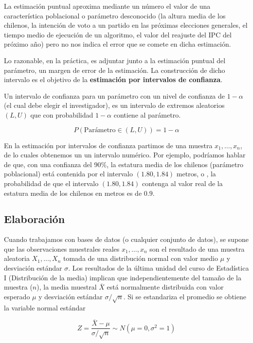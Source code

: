 \documentclass[
  11pt,
]{book}
\theoremstyle{definition}
\theoremstyle{definition}
\theoremstyle{definition}
\theoremstyle{definition}
\theoremstyle{remark}
\begin{document}
La estimación puntual aproxima mediante un número el valor de una característica poblacional o parámetro desconocido (la altura media de los chilenos, la intención de voto a un partido en las próximas elecciones generales, el tiempo medio de ejecución de un algoritmo, el valor del reajuste del IPC del próximo año) pero no nos indica el error que se comete en dicha estimación. \citep[página 254]{Devore}

Lo razonable, en la práctica, es adjuntar junto a la estimación puntual del parámetro, un margen de error de la estimación. La construcción de dicho intervalo es el objetivo de la \textbf{estimación por intervalos de confianza}.

Un intervalo de confianza para un parámetro con un nivel de confianza de \(1-\alpha\) (el cual debe elegir el investigador), es un intervalo de extremos aleatorios \((L,U)\) que con probabilidad \(1-\alpha\) contiene al parámetro.

\[
P(\text{Parámetro} \in (L,U)) = 1-\alpha
\]

En la estimación por intervalos de confianza partimos de una muestra \(x_1,\ldots,x_n\), de lo cuales obtenemos un un intervalo numérico. Por ejemplo, podríamos hablar de que, con una confianza del \(90\%\), la estatura media de los chilenos (parámetro poblacional) está contenida por el intervalo \((1.80, 1.84)\) metros, o , la probabilidad de que el intervalo \((1.80,1.84)\) contenga al valor real de la estatura media de los chilenos en metros es de \(0.9\).

\subsection{Elaboración}\label{elaboraciuxf3n}

Cuando trabajamos con bases de datos (o cualquier conjunto de datos), se supone que las observaciones muestrales reales \(x_1,\ldots , x_n\) son el resultado de una muestra aleatoria \(X_1,\ldots , X_n\) tomada de una distribución normal con valor medio \(\mu\) y desviación estándar \(\sigma\). Los resultados de la última unidad del curso de Estadística I (Distribución de la media) implican que independientemente del tamaño de la muestra (\(n\)), la media muestral \(\bar{X}\) está normalmente distribuida con valor esperado \(\mu\) y desviación estándar \(\sigma/\sqrt{n}\). Si se estandariza el promedio se obtiene la variable normal estándar

\begin{equation}
Z = \frac{\bar{X} - \mu}{\sigma/\sqrt{n}} \sim N(\mu = 0,\sigma^2=1)
\label{eq:normalestandar}
\end{equation}
\end{document}
